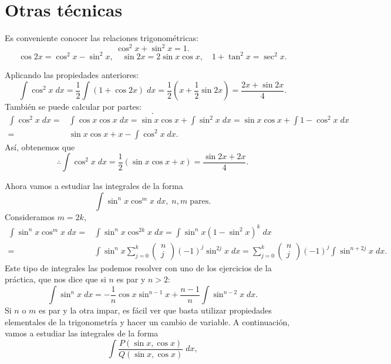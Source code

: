 \section{Otras técnicas}
Es conveniente conocer las relaciones trigonométricas:
\[\cos^{2}x+\sin ^{2}x = 1.\]
\[\cos2x = \cos^{2}x- \sin ^{2}x, \quad \sin2x = 2\sin x \cos x, \quad 1 + \tan^{2}x = \sec^{2}x .\]
\begin{eg}
\normalfont Aplicando las propiedades anteriores:
\[\int \cos^{2}x \; dx = \frac{1}{2}\int \left(1+\cos2x\right) \; dx = \frac{1}{2}\left(x+\frac{1}{2}\sin2x\right) = \frac{2x+\sin2x}{4} .\]
También se puede calcular por partes:
\[  .\]
\[
\begin{split}
	\int \cos^{2}x  \; dx = & \int \cos x \cos x \; dx = \sin x \cos x + \int \sin ^{2}x \; dx = \sin x \cos x + \int 1 - \cos ^{2}x \; dx \\
	= & \sin x \cos x + x - \int \cos^{2}x \; dx.
\end{split}
\]
Así, obtenemos que
\[\therefore\int \cos^{2}x \; dx = \frac{1}{2}\left(\sin x\cos x + x\right) = \frac{\sin2x + 2x}{4}.\]
\end{eg}
Ahora vamos a estudiar las integrales de la forma
\[\int \sin ^{n}x \cos ^{m}x \; dx, \; n,m \; \text{pares}.\]
Consideramos $\displaystyle m = 2k $,
\[
\begin{split}
	\int \sin ^{n}x \cos ^{m}x \; dx = & \int \sin ^{n}x \cos ^{2k}x \; dx = \int \sin ^{n}x\left(1-\sin ^{2}x\right)^{k } \; dx \\
	= & \int \sin ^{n}x \sum^{k}_{j=0}\begin{pmatrix} n \\ j \end{pmatrix}\left(-1\right)^{j}\sin ^{2j}x \; dx = \sum^{k}_{j=0}\begin{pmatrix} n\\j \end{pmatrix}\left(-1\right)^{j}\int \sin ^{n+2j}x \; dx.
\end{split}
\]
Este tipo de integrales las podemos resolver con uno de los ejercicios de la práctica, que nos dice que si $\displaystyle n $ es par y $\displaystyle n > 2 $:
\[\int \sin ^{n}x \; dx = -\frac{1}{n}\cos x \sin ^{n-1}x + \frac{n-1}{n}\int \sin ^{n-2}x \; dx.\]
Si $\displaystyle n $ o $\displaystyle m $ es par y la otra impar, es fácil ver que basta utilizar propiedades elementales de la trigonometría y hacer un cambio de variable. A continuación, vamos a estudiar las integrales de la forma
\[\int \frac{P\left(\sin x, \cos x\right)}{Q\left(\sin x, \cos x\right)} \; dx ,\]
